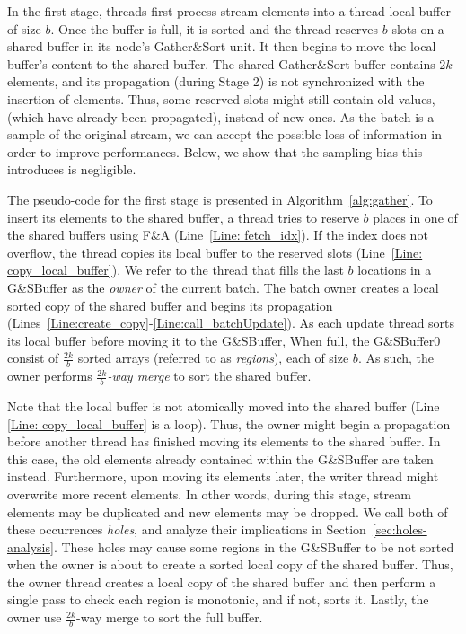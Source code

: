 In the first stage, threads first process stream elements into a thread-local buffer of size $b$. Once the buffer is full, it is sorted and the thread reserves $b$ slots on a shared buffer in its node's Gather\&Sort unit. It then begins to move the local buffer's content to the shared buffer. The shared Gather\&Sort buffer contains $2k$ elements, and its propagation (during Stage 2) is not synchronized with the insertion of elements. Thus, some reserved slots might still contain old values, (which have already been propagated), instead of new ones. As the batch is a sample of the original stream, we can accept the possible loss of information in order to improve performances. Below, we show that the sampling bias this introduces is negligible.

The pseudo-code for the first stage is presented in Algorithm~\ref{alg:gather}. To insert its elements to the shared buffer, a thread tries to reserve $b$ places in one of the shared buffers using F\&A (Line~\ref{Line: fetch_idx}). If the index does not overflow, the thread copies its local buffer to the reserved slots (Line~\ref{Line: copy_local_buffer}). We refer to the thread that fills the last $b$ locations in a G\&SBuffer as the \emph{owner} of the current batch. The batch owner creates a local sorted copy of the shared buffer and begins its propagation (Lines~\ref{Line:create_copy}-\ref{Line:call_batchUpdate}). As each update thread sorts its local buffer before moving it to the G\&SBuffer, When full, the G\&SBuffer0 consist of $\frac{2k}{b}$ sorted arrays (referred to as \emph{regions}), each of size $b$. As such, the owner performs \emph{$\frac{2k}{b}$-way merge} to sort the shared buffer. 

Note that the local buffer is not atomically moved into the shared buffer (Line \ref{Line: copy_local_buffer} is a loop). Thus, the owner might begin a propagation before another thread has finished moving its elements to the shared buffer. In this case, the old elements already contained within the G\&SBuffer are taken instead. Furthermore, upon moving its elements later, the writer thread might overwrite more recent elements. In other words, during this stage, stream elements may be duplicated and new elements may be dropped. We call both of these occurrences \emph{holes}, and analyze their implications in Section~\ref{sec:holes-analysis}. These holes may cause some regions in the G\&SBuffer to be not sorted when the owner is about to create a sorted local copy of the shared buffer. Thus, the owner thread creates a local copy of the shared buffer and then perform a single pass to check each region is monotonic, and if not, sorts it. Lastly, the owner use $\frac{2k}{b}$-way merge to sort the full buffer. 


